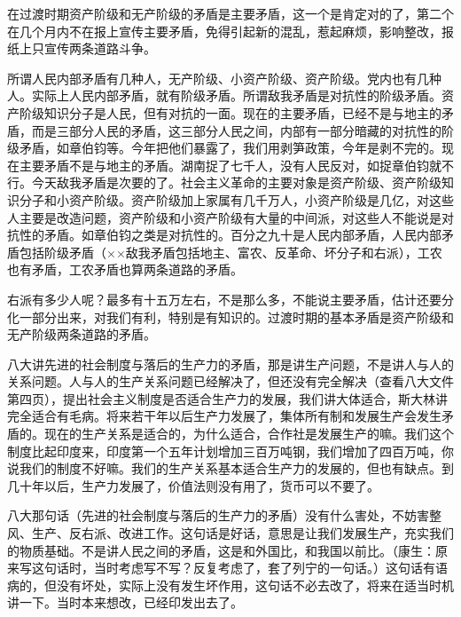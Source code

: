 在过渡时期资产阶级和无产阶级的矛盾是主要矛盾，这一个是肯定对的了，第二个在几个月内不在报上宣传主要矛盾，免得引起新的混乱，惹起麻烦，影响整改，报纸上只宣传两条道路斗争。

所谓人民内部矛盾有几种人，无产阶级、小资产阶级、资产阶级。党内也有几种人。实际上人民内部矛盾，就有阶级矛盾。所谓敌我矛盾是对抗性的阶级矛盾。资产阶级知识分子是人民，但有对抗的一面。现在的主要矛盾，已经不是与地主的矛盾，而是三部分人民的矛盾，这三部分人民之间，内部有一部分暗藏的对抗性的阶级矛盾，如章伯钧等。今年把他们暴露了，我们用剥笋政策，今年是剥不完的。现在主要矛盾不是与地主的矛盾。湖南捉了七千人，没有人民反对，如捉章伯钧就不行。今天敌我矛盾是次要的了。社会主义革命的主要对象是资产阶级、资产阶级知识分子和小资产阶级。资产阶级加上家属有几千万人，小资产阶级是几亿，对这些人主要是改造问题，资产阶级和小资产阶级有大量的中间派，对这些人不能说是对抗性的矛盾。如章伯钧之类是对抗性的。百分之九十是人民内部矛盾，人民内部矛盾包括阶级矛盾（××敌我矛盾包括地主、富农、反革命、坏分子和右派），工农也有矛盾，工农矛盾也算两条道路的矛盾。

右派有多少人呢？最多有十五万左右，不是那么多，不能说主要矛盾，估计还要分化一部分出来，对我们有利，特别是有知识的。过渡时期的基本矛盾是资产阶级和无产阶级两条道路的矛盾。

八大讲先进的社会制度与落后的生产力的矛盾，那是讲生产问题，不是讲人与人的关系问题。人与人的生产关系问题已经解决了，但还没有完全解决（查看八大文件第四页），提出社会主义制度是否适合生产力的发展，我们讲大体适合，斯大林讲完全适合有毛病。将来若干年以后生产力发展了，集体所有制和发展生产会发生矛盾的。现在的生产关系是适合的，为什么适合，合作社是发展生产的嘛。我们这个制度比起印度来，印度第一个五年计划增加三百万吨钢，我们增加了四百万吨，你说我们的制度不好嘛。我们的生产关系基本适合生产力的发展的，但也有缺点。到几十年以后，生产力发展了，价值法则没有用了，货币可以不要了。

八大那句话（先进的社会制度与落后的生产力的矛盾）没有什么害处，不妨害整风、生产、反右派、改进工作。这句话是好话，意思是让我们发展生产，充实我们的物质基础。不是讲人民之间的矛盾，这是和外国比，和我国以前比。（康生：原来写这句话时，当时考虑写不写？反复考虑了，套了列宁的一句话。）这句话有语病的，但没有坏处，实际上没有发生坏作用，这句话不必去改了，将来在适当时机讲一下。当时本来想改，已经印发出去了。


